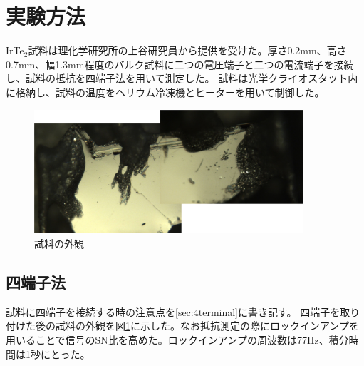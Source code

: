 \documentclass[11pt,a4paper]{jsarticle}
\begin{document}
\section{実験方法}
IrTe$_2$試料は理化学研究所の上谷研究員から提供を受けた。厚さ0.2mm、高さ0.7mm、幅1.3mm程度のバルク試料に二つの電圧端子と二つの電流端子を接続し、試料の抵抗を四端子法を用いて測定した。
試料は光学クライオスタット内に格納し、試料の温度をヘリウム冷凍機とヒーターを用いて制御した。
\begin{figure}[p]
  \begin{center}
   \includegraphics[width=100mm]{sample.eps}
  \end{center}
  \caption{試料の外観}
  \label{fig:sample}
\end{figure}

\subsection{四端子法}
試料に四端子を接続する時の注意点を\ref{sec:4terminal}に書き記す。 四端子を取り付けた後の試料の外観を図\ref{fig:sample}に示した。なお抵抗測定の際にロックインアンプを用いることで信号のSN比を高めた。ロックインアンプの周波数は77Hz、積分時間は1秒にとった。
\end{document}
